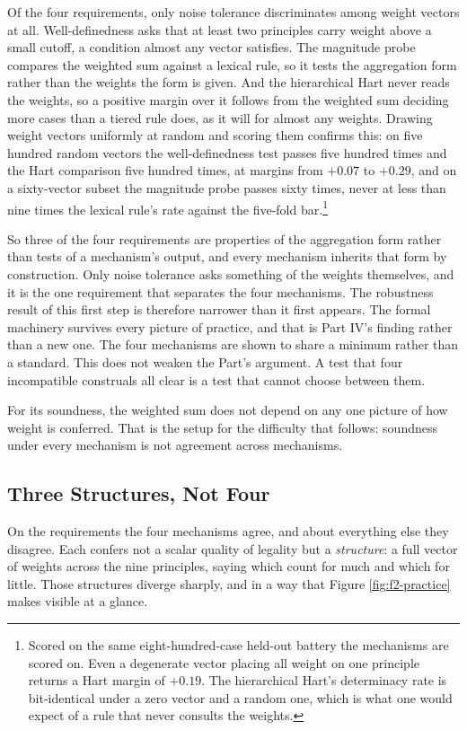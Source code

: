 Of the four requirements, only noise tolerance discriminates among weight
vectors at all. Well-definedness asks that at least two principles carry
weight above a small cutoff, a condition almost any vector satisfies. The
magnitude probe compares the weighted sum against a lexical rule, so it tests
the aggregation form rather than the weights the form is given.
And the hierarchical Hart never reads the weights, so a positive margin over
it follows from the weighted sum deciding more cases than a tiered rule does,
as it will for almost any weights. Drawing weight vectors uniformly at
random and scoring them confirms this: on five hundred random vectors the
well-definedness test passes five hundred times and the Hart comparison five
hundred times, at margins from $+0.07$ to $+0.29$, and on a sixty-vector
subset the magnitude probe passes sixty times, never at less than nine times
the
lexical rule's rate against the five-fold bar.\footnote{Scored on the same
eight-hundred-case held-out battery the mechanisms are scored on. Even a
degenerate vector placing all weight on one principle returns a Hart margin of
$+0.19$. The hierarchical Hart's determinacy rate is bit-identical under a
zero vector and a random one, which is what one would expect of a rule that
never consults the weights.}

So three of the four requirements are properties of the aggregation form
rather than tests of a mechanism's output, and every mechanism inherits that
form by construction. Only noise tolerance asks something of the weights
themselves, and it is the one requirement that separates the four mechanisms.
The robustness result of this first step is therefore narrower than it first
appears. The formal machinery survives every picture of practice, and that is
Part IV's finding rather than a new one. The four mechanisms
are shown to share a minimum rather than a standard. This does not weaken the
Part's argument. A test that four incompatible construals all clear is a test
that cannot choose between them.

For its soundness, the weighted sum does not depend on any one picture of how
weight is conferred. That is the setup for the difficulty that follows: soundness under
every mechanism is not agreement across mechanisms.

\subsection{Three Structures, Not Four}

On the requirements the four mechanisms agree, and about everything else
they disagree. Each confers not a scalar quality of legality but a
\textit{structure}: a full vector of weights across the nine principles,
saying which count for much and which for little. Those structures diverge
sharply, and in a way that Figure \ref{fig:f2-practice} makes visible at a
glance.

